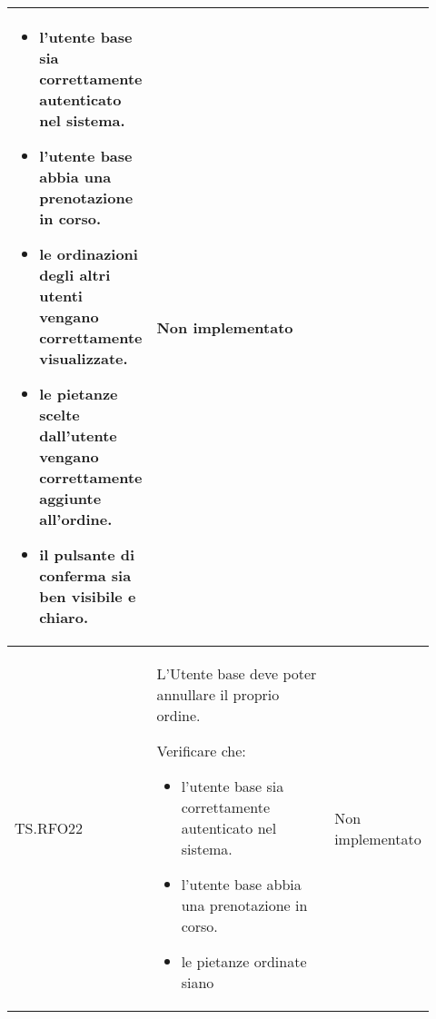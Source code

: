 \begin{longtable}{|p{0.12\linewidth}|p{0.58\linewidth}|p{0.22\linewidth}|}
\begin{itemize}
        \item l'utente base sia correttamente autenticato nel sistema.
        \item l'utente base abbia una prenotazione in corso.
        \item le ordinazioni degli altri utenti vengano correttamente visualizzate.
        \item le pietanze scelte dall'utente vengano correttamente aggiunte all'ordine.
        \item il pulsante di conferma sia ben visibile e chiaro.
    \end{itemize}&
    Non implementato \\
    \hline
    TS.RFO22 & 
    L’Utente base deve poter annullare il proprio ordine.   \par 
    Verificare che: 
    \begin{itemize}
        \item l'utente base sia correttamente autenticato nel sistema.
        \item l'utente base abbia una prenotazione in corso.
        \item le pietanze ordinate siano 
    \end{itemize}&
    Non implementato \\
\end{longtable}
